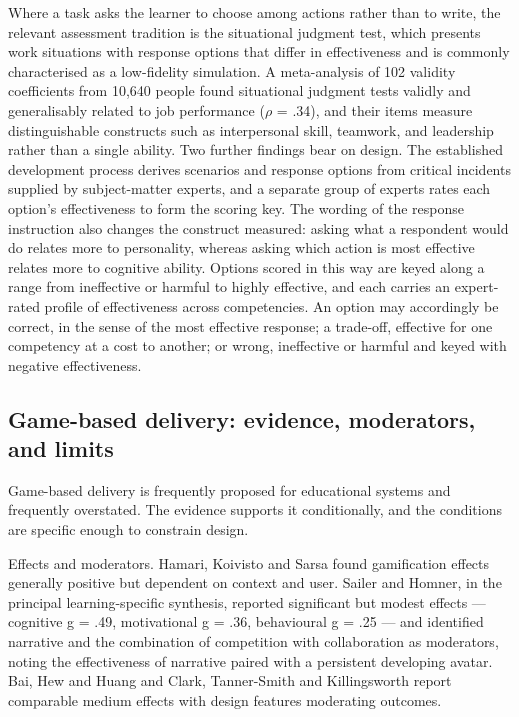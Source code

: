 Where a task asks the learner to choose among actions rather than to write, the relevant assessment tradition is the situational judgment test, which presents work situations with response options that differ in effectiveness and is commonly characterised as a low-fidelity simulation\cite{r23}. A meta-analysis of 102 validity coefficients from 10,640 people found situational judgment tests validly and generalisably related to job performance ($\rho$ = .34)\cite{r24}, and their items measure distinguishable constructs such as interpersonal skill, teamwork, and leadership rather than a single ability\cite{r25}. Two further findings bear on design. The established development process derives scenarios and response options from critical incidents supplied by subject-matter experts\cite{r26}, and a separate group of experts rates each option's effectiveness to form the scoring key\cite{r27}. The wording of the response instruction also changes the construct measured: asking what a respondent would do relates more to personality, whereas asking which action is most effective relates more to cognitive ability\cite{r28}. Options scored in this way are keyed along a range from ineffective or harmful to highly effective, and each carries an expert-rated profile of effectiveness across competencies. An option may accordingly be correct, in the sense of the most effective response; a trade-off, effective for one competency at a cost to another; or wrong, ineffective or harmful and keyed with negative effectiveness.

\subsection{Game-based delivery: evidence, moderators, and limits}

Game-based delivery is frequently proposed for educational systems and frequently overstated. The evidence supports it conditionally, and the conditions are specific enough to constrain design.

Effects and moderators. Hamari, Koivisto and Sarsa\cite{r29} found gamification effects generally positive but dependent on context and user. Sailer and Homner\cite{r30}, in the principal learning-specific synthesis, reported significant but modest effects --- cognitive g = .49, motivational g = .36, behavioural g = .25 --- and identified narrative and the combination of competition with collaboration as moderators, noting the effectiveness of narrative paired with a persistent developing avatar. Bai, Hew and Huang\cite{r31} and Clark, Tanner-Smith and Killingsworth\cite{r32} report comparable medium effects with design features moderating outcomes.

